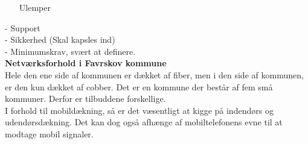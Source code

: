 \begin{itemize}
\item[Ulemper]
\end{itemize}
- Support\\
- Sikkerhed (Skal kapsles ind)\\
- Minimumskrav, svært at definere.\\ 
\textbf{Netværksforhold i Favrskov kommune}\\
Hele den ene side af kommunen er dækket af fiber, men i den side af kommunen, er den kun dækket af cobber. Det er en kommune der består af fem små kommuner. Derfor er tilbuddene forskellige.\\
I forhold til mobildækning, så er det væsentligt at kigge på indendørs og udendørsdækning. Det kan dog også afhænge af mobiltelefonens evne til at modtage mobil signaler.\\